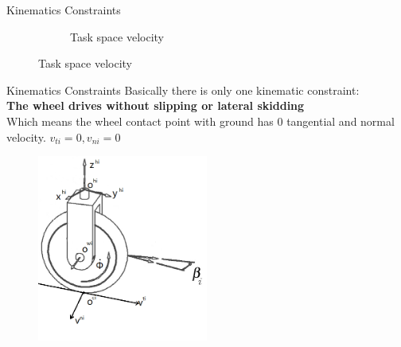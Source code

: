 \documentclass[10pt]{beamer}
\begin{document}
\begin{frame}{Kinematics Constraints}
\begin{figure}
\begin{subfigure}[t]{0.5\textwidth}
{\begin{tikzpicture}[rotate=30 ]
		                \end{tikzpicture}
		            }
                    \caption{Task space velocity}
                    \label{fig:sub2}
                \end{subfigure}
            \end{figure}

\end{frame}


\begin{frame}{Kinematics Constraints}
    Basically there is only one kinematic constraint:\\\textbf{The wheel drives without slipping or lateral skidding}\\
    Which means the wheel contact point with ground has 0 tangential and normal velocity. $v_{ti}=0, v_{ni}=0$
    \begin{figure}
        \centering
        \includegraphics[width=0.5\textwidth]{Figure/wheel.png}
        \label{fig:wheel}
    \end{figure}
\end{frame}
\end{document}

